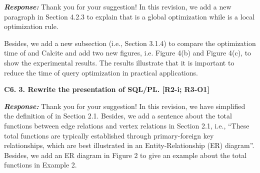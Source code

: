\textbf{\textit{Response: }}
Thank you for your suggestion! 
In this revision, we add a new paragraph in Section 4.2.3 to explain that \filterrule is a global optimization while \fusionrule is a local optimization rule.

Besides, we add a new subsection (i.e., Section 3.1.4) to compare the optimization time of \name and Calcite and add two new figures, i.e. Figure 4(b) and Figure 4(c), to show the experimental results.
The results illustrate that it is important to reduce the time of query optimization in practical applications. 


\textbf{
C6. 3. Rewrite the presentation of SQL/PL. [R2-i; R3-O1]
}

\textbf{\textit{Response: }}
Thank you for your suggestion! 
In this revision, we have simplified the definition of \rgmapping in Section 2.1.
Besides, we add a sentence about the total functions between edge relations and vertex relations in Section 2.1, i.e., ``These total functions are typically established through primary-foreign key relationships, which are best illustrated in an Entity-Relationship (ER) diagram''.
Besides, we add an ER diagram in Figure 2 to give an example about the total functions in Example 2. 
